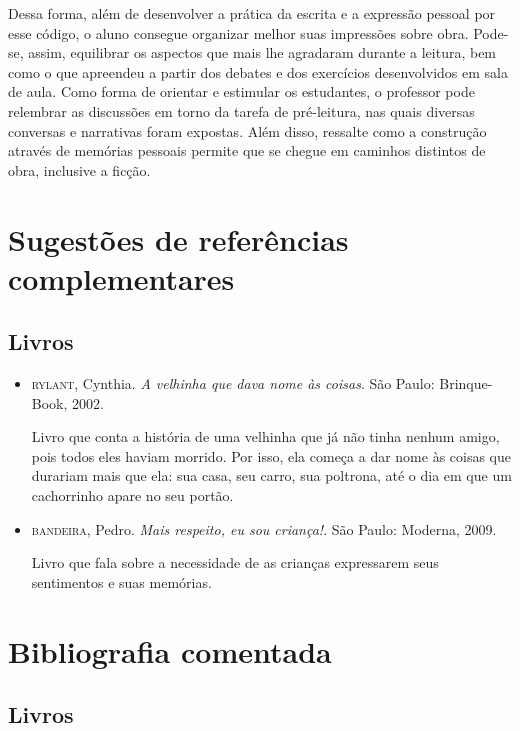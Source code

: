 \documentclass[11pt]{extarticle}
\begin{document}
Dessa forma, além de desenvolver a prática da escrita e a expressão pessoal por esse código, o aluno consegue organizar melhor suas impressões sobre obra. Pode-se, assim, equilibrar os aspectos que mais lhe agradaram durante a leitura, bem como o que apreendeu a partir dos debates e dos exercícios desenvolvidos em sala de aula. Como forma de orientar e estimular os estudantes, o professor pode relembrar as discussões em torno da tarefa de pré-leitura, nas quais diversas conversas e narrativas foram expostas. Além disso, ressalte como a construção através de memórias pessoais permite que se chegue em caminhos distintos de obra, inclusive a ficção. 


\section{Sugestões de referências complementares}

\subsection{Livros} 

\begin{itemize}
\item \textsc{rylant}, Cynthia. \textit{A velhinha que dava nome às coisas}. São Paulo: Brinque-Book, 2002.

Livro que conta a história de uma velhinha que já não tinha nenhum amigo, pois todos eles haviam morrido. Por isso, ela começa a dar nome às coisas que durariam mais que ela: sua casa, seu carro, sua poltrona, até o dia em que um cachorrinho apare no seu portão.

\item \textsc{bandeira}, Pedro. \textit{Mais respeito, eu sou criança!}. São Paulo: Moderna, 2009.

Livro que fala sobre a necessidade de as crianças expressarem seus sentimentos e suas memórias.

\end{itemize}

\section{Bibliografia comentada}
\subsection{Livros}
\end{document}
